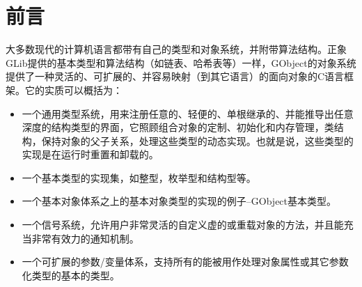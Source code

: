 \chapter*{前言}

大多数现代的计算机语言都带有自己的类型和对象系统，并附带算法结构。正象GLib提供的基本类型和算法结构（如链表、哈希表等）一样，GObject的对象系统提供了一种灵活的、可扩展的、并容易映射（到其它语言）的面向对象的C语言框架。它的实质可以概括为：
\begin{itemize}
	\item 一个通用类型系统，用来注册任意的、轻便的、单根继承的、并能推导出任意深度的结构类型的界面，它照顾组合对象的定制、初始化和内存管理，类结构，保持对象的父子关系，处理这些类型的动态实现。也就是说，这些类型的实现是在运行时重置和卸载的。
	\item 一个基本类型的实现集，如整型，枚举型和结构型等。
	\item 一个基本对象体系之上的基本对象类型的实现的例子–GObject基本类型。
	\item 一个信号系统，允许用户非常灵活的自定义虚的或重载对象的方法，并且能充当非常有效力的通知机制。
	\item 一个可扩展的参数/变量体系，支持所有的能被用作处理对象属性或其它参数化类型的基本的类型。
\end{itemize}
